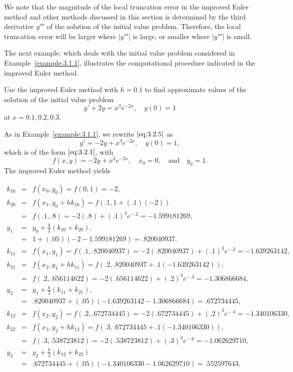 \documentclass{ximera}
\begin{document}
We note that the magnitude of the local truncation error in the
improved Euler method and other methods discussed in this section is
determined by the third derivative $y'''$ of the solution of the
initial value problem. Therefore, the local truncation error will be
larger where $|y'''|$ is large, or smaller where $|y'''|$ is small.

The next example, which deals with the initial value problem
considered in Example~\ref{example:3.1.1}, illustrates
the computational procedure indicated in the improved Euler method.

\begin{example}\label{example:3.2.1}
Use the improved Euler method with $h=0.1$ to find approximate values
of the solution of the initial value problem
\begin{equation}\label{eq:3.2.5}
y'+2y=x^3e^{-2x},\quad y(0)=1
\end{equation}
at $x=0.1,0.2,0.3$.

\begin{explanation}
As in Example~\ref{example:3.1.1}, we rewrite $\eqref{eq:3.2.5}$  as
$$
y'=-2y+x^3e^{-2x},\quad y(0)=1,
$$
which is of the form $\eqref{eq:3.2.1}$, with
$$
f(x,y)=-2y+x^3e^{-2x},\quad x_0=0,\quad\mbox{and}\quad y_0=1.
$$
The improved Euler method yields

\begin{eqnarray*}
k_{10} & = & f(x_0,y_0)
  = f(0,1)=-2,\\
k_{20} & = & f(x_1,y_0+hk_{10})=f(.1,1+(.1)(-2))\\
 &=& f(.1,.8)=-2(.8)+(.1)^3e^{-.2}=-1.599181269,\\
y_1&=&y_0+\frac{h}{2}(k_{10}+k_{20}),\\
&=&1+(.05)(-2-1.599181269)=.820040937,\\
k_{11} & = & f(x_1,y_1)
  = f(.1,.820040937)= -2(.820040937)+(.1)^3e^{-.2}=-1.639263142,\\
k_{21} & = & f(x_2,y_1+hk_{11})=f(.2,.820040937+.1(-1.639263142)),\\
 &=&
f(.2,.656114622)=-2(.656114622)+(.2)^3e^{-.4}=-1.306866684,\\
y_2&=&y_1+\frac{h}{2}(k_{11}+k_{21}),\\
&=&.820040937+(.05)(-1.639263142-1.306866684)=.672734445,\\
k_{12} & = & f(x_2,y_2)
  = f(.2,.672734445)= -2(.672734445)+(.2)^3e^{-.4}=-1.340106330,\\
k_{22} & = & f(x_3,y_2+hk_{12})=f(.3,.672734445+.1(-1.340106330)),\\
 &=&
f(.3,.538723812)=-2(.538723812)+(.3)^3e^{-.6}=-1.062629710,\\
y_3&=&y_2+\frac{h}{2}(k_{12}+k_{22})\\
&=&.672734445+(.05)(-1.340106330-1.062629710)=.552597643.
\end{eqnarray*}
\end{explanation}
\end{example}
\end{document}
